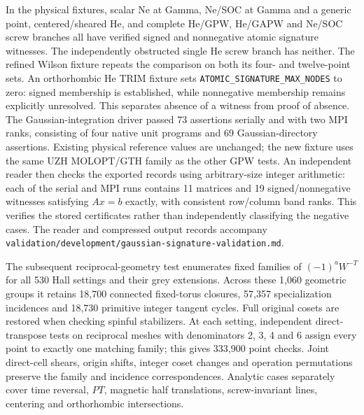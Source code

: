 \documentclass[11pt]{article}
\begin{document}
In the physical fixtures, scalar Ne at Gamma, Ne/SOC at Gamma and a
generic point, centered/sheared He, and complete He/GPW, He/GAPW and
Ne/SOC screw branches all have verified signed and nonnegative atomic
signature witnesses. The independently obstructed single He screw
branch has neither. The refined Wilson fixture repeats the comparison
on both its four- and twelve-point sets. An orthorhombic He TRIM
fixture sets \texttt{ATOMIC\_SIGNATURE\_MAX\_NODES} to zero: signed
membership is established, while nonnegative membership remains
explicitly unresolved. This separates absence of a witness from
proof of absence. The Gaussian-integration driver passed 73 assertions
serially and with two MPI ranks, consisting of four native unit
programs and 69 Gaussian-directory assertions. Existing physical
reference values are unchanged; the new fixture uses the same UZH
MOLOPT/GTH family as the other GPW tests.
An independent reader then checks the exported records using
arbitrary-size integer arithmetic: each of the serial and MPI runs
contains 11 matrices and 19 signed/nonnegative witnesses satisfying
$Ax=b$ exactly, with consistent row/column band ranks. This verifies
the stored certificates rather than independently classifying the
negative cases. The reader and compressed output records accompany
\texttt{validation/development/gaussian-signature-validation.md}.

The subsequent reciprocal-geometry test enumerates fixed families of
$(-1)^aW^{-T}$ for all 530 Hall settings and their grey extensions.
Across these 1,060 geometric groups it retains 18,700 connected
fixed-torus closures, 57,357 specialization incidences and 18,730
primitive integer tangent cycles. Full original cosets are restored
when checking spinful stabilizers. At each setting, independent
direct-transpose tests on reciprocal meshes with denominators 2, 3, 4
and 6 assign every point to exactly one matching family; this gives
333,900 point checks. Joint direct-cell shears, origin shifts, integer
coset changes and operation permutations preserve the family and
incidence correspondences. Analytic cases separately cover time
reversal, $PT$, magnetic half translations, screw-invariant lines,
centering and orthorhombic intersections.
\end{document}
